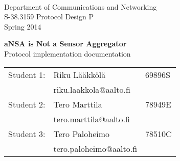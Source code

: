 \begin{titlepage}

\begin{flushleft}
 \\
Department of Communications and Networking \\
S-38.3159 Protocol Design P \\
Spring 2014
\end{flushleft}

\vspace{8cm}
\begin{center}
  {\LARGE \textbf{aNSA is Not a Sensor Aggregator}}\\
  {\LARGE Protocol implementation documentation}
\end{center}

\vfill

\begin{center}
\begin{tabular}{rll}
	Student 1:	& Riku Lääkkölä 	& 69896S \\
				& riku.laakkola@aalto.fi & \\    
    Student 2: 	& Tero Marttila		& 78949E \\
    			& tero.marttila@aalto.fi & \\
    Student 3:	& Tero Paloheimo	& 78510C \\
    			& tero.paloheimo@aalto.fi & \\
\end{tabular}
\end{center}

\end{titlepage}